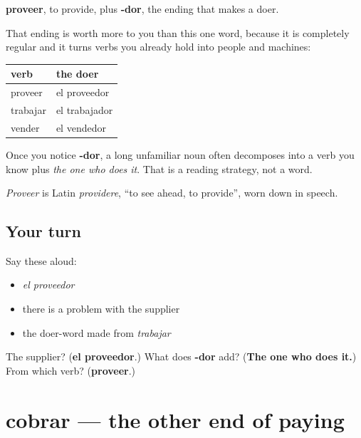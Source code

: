 \begin{cousinweb}
\textbf{proveer}, to provide, plus \textbf{-dor}, the ending that makes a doer.

That ending is worth more to you than this one word, because it is completely regular and it turns verbs you already hold into people and machines:

\noindent
\begin{tabularx}{\linewidth}{@{}>{\raggedright\arraybackslash}X>{\raggedright\arraybackslash}X@{}}
\toprule
\textbf{verb} & \textbf{the doer} \\
\midrule
proveer & el proveedor \\
trabajar & el trabajador \\
vender & el vendedor \\
\bottomrule
\end{tabularx}

Once you notice \textbf{-dor}, a long unfamiliar noun often decomposes into a verb you know plus \emph{the one who does it}. That is a reading strategy, not a word.

\emph{Proveer} is Latin \emph{providere}, \textquotedblleft{}to see ahead, to provide\textquotedblright{}, worn down in speech.
\end{cousinweb}

\subsection*{Your turn}
Say these aloud:

\begin{itemize}
\raggedright
  \item \emph{el proveedor}
  \item there is a problem with the supplier
  \item the doer-word made from \emph{trabajar}
\end{itemize}

\begin{tcolorbox}[breakable,colback=teal!4,colframe=teal!35!black,title={Before you move on}]
The supplier? (\textbf{el proveedor}.) What does \textbf{-dor} add? (\textbf{The one who does it.}) From which verb? (\textbf{proveer}.)
\end{tcolorbox}
\section[cobrar]{cobrar — the other end of paying}

\label{lesson:ES-C431-cobrar}



